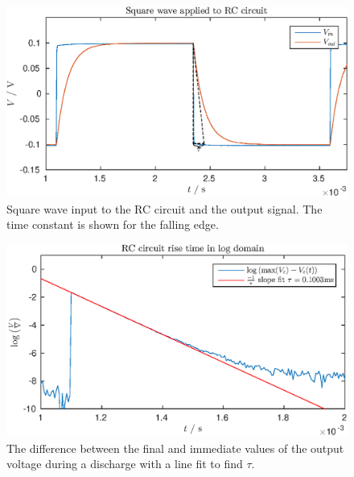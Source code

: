 

\newcommand{\reffig}[1]{Fig.~\ref{#1}}



\newpage
\begin{figure}[!htb]
    \center
    \includegraphics{ex1-step.eps}
    \caption{Square wave input to the RC circuit and the output signal. The time constant is shown for the falling edge.}
    \label{fig:ex1-1}
\end{figure}
\begin{figure}[!htb]
    \center
    \includegraphics{ex1-log.eps}
    \caption{The difference between the final and immediate values of the output voltage during a discharge with a line fit to find \(\tau\).}
    \label{fig:ex1-2}
\end{figure}
